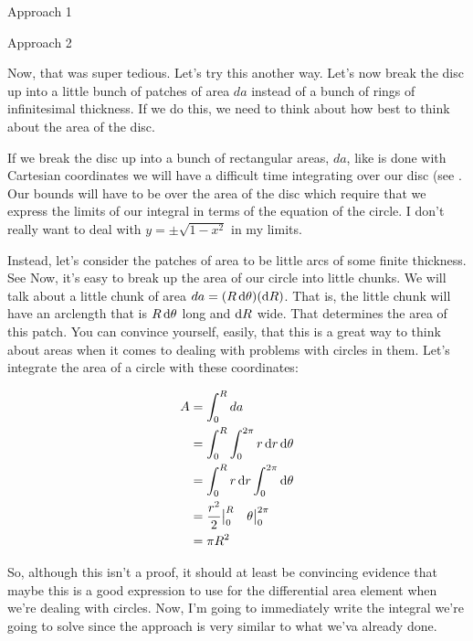 \begin{homeworkProblem}
\begin{homeworkSection}{Approach 1}
        \end{homeworkSection}
    
    \begin{homeworkSection}{Approach 2}

        Now, that was super tedious. Let's try this another way. Let's
        now break the disc up into a little bunch of patches of area
        $da$ instead of a bunch of rings of infinitesimal thickness. If
        we do this, we need to think about how best to think about the
        area of the disc.
        
        If we break the disc up into a bunch of
        rectangular areas, $da$, like is done with Cartesian coordinates
        we will have a difficult time integrating over our disc (see
        . Our bounds will have to be over the area of the disc which
        require that we express the limits of our integral in terms of
        the equation of the circle. I don't really want to deal with $y
        = \pm \sqrt{1-x^2}$ in my limits.

        Instead, let's consider the patches of area to be little arcs of
        some finite thickness. See %
        Now, it's easy to break up the area of our circle into little
        chunks. We will talk about a little chunk of area $da = (R \mathop{}\!\mathrm{d}
        \theta)(\mathop{}\!\mathrm{d} R)$. That is, the little chunk will have an
        arclength that is $R \mathop{}\!\mathrm{d} \theta$ long and $\mathop{}\!\mathrm{d} R$ wide. That
        determines the area of this patch. You can convince yourself,
        easily, that this is a great way to think about areas when it
        comes to dealing with problems with circles in them. Let's
        integrate the area of a circle with these coordinates:

        \begin{align}
            A &= \int_0^R da \nonumber \\
            &=  \int_0^R \int_0^{2\pi} r \mathop{}\!\mathrm{d} r \mathop{}\!\mathrm{d} \theta
            \nonumber \\
            &= \int_0^R r \mathop{}\!\mathrm{d} r \int_0^{2\pi} \mathop{}\!\mathrm{d} \theta \nonumber \\
            &= \frac{r^2}{2}\big|_0^R \quad \theta\big|_0^{2\pi}
            \nonumber \\
            &= \pi R^2 \nonumber 
        \end{align}

        So, although this isn't a proof, it should at least be
        convincing evidence that maybe this is a good expression to use
        for the differential area element when we're dealing with
        circles. Now, I'm going to immediately write the integral we're
        going to solve since the approach is very similar to what we'va
        already done.


\end{homeworkSection}
\end{homeworkProblem}
